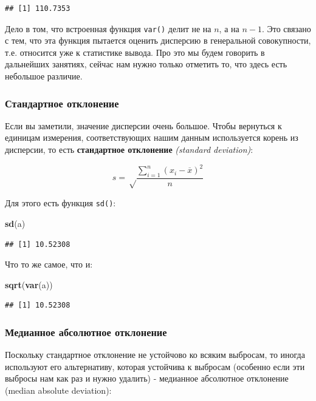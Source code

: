 \documentclass[]{book}
\newenvironment{Shaded}{\begin{snugshade}}{\end{snugshade}}
\newcommand{\KeywordTok}[1]{\textcolor[rgb]{0.13,0.29,0.53}{\textbf{#1}}}
\newcommand{\NormalTok}[1]{#1}
\begin{document}
\begin{verbatim}
## [1] 110.7353
\end{verbatim}

Дело в том, что встроенная функция \texttt{var()} делит не на \(n\), а
на \(n-1\). Это связано с тем, что эта функция пытается оценить
дисперсию в генеральной совокупности, т.е. относится уже к статистике
вывода. Про это мы будем говорить в дальнейших занятиях, сейчас нам
нужно только отметить то, что здесь есть небольшое различие.

\subsubsection{Стандартное отклонение}\label{sd}

Если вы заметили, значение дисперсии очень большое. Чтобы вернуться к
единицам измерения, соответствующих нашим данным используется корень из
дисперсии, то есть \textbf{стандартное отклонение} \emph{(standard
deviation)}:

\[s= \sqrt\frac{\sum\limits_{i=1}^{n} (x_{i} - \overline{x})^2} {n}\]

Для этого есть функция \texttt{sd()}:

\begin{Shaded}
\begin{Highlighting}[]
\KeywordTok{sd}\NormalTok{(a)}
\end{Highlighting}
\end{Shaded}

\begin{verbatim}
## [1] 10.52308
\end{verbatim}

Что то же самое, что и:

\begin{Shaded}
\begin{Highlighting}[]
\KeywordTok{sqrt}\NormalTok{(}\KeywordTok{var}\NormalTok{(a))}
\end{Highlighting}
\end{Shaded}

\begin{verbatim}
## [1] 10.52308
\end{verbatim}

\subsubsection{Медианное абсолютное отклонение}\label{mad}

Поскольку стандартное отклонение не устойчово ко всяким выбросам, то
иногда используют его альтернативу, которая устойчива к выбросам
(особенно если эти выбросы нам как раз и нужно удалить) - медианное
абсолютное отклонение (median absolute deviation):
\end{document}
